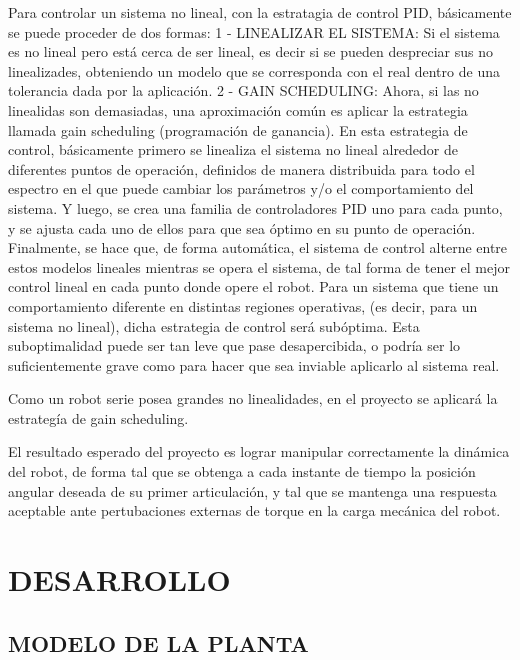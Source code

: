 \documentclass{article}
\begin{document}
Para controlar un sistema no lineal, con la estratagia de control PID, básicamente se puede proceder de dos formas:
1 - LINEALIZAR EL SISTEMA: Si el sistema es no lineal pero está cerca de ser lineal, es decir si se pueden despreciar sus no linealizades, obteniendo un modelo que se corresponda con el real dentro de una tolerancia dada por la aplicación.
2 - GAIN SCHEDULING: Ahora, si las no linealidas son demasiadas, una aproximación común es aplicar la estrategia llamada gain scheduling (programación de ganancia). En esta estrategia de control, básicamente primero se linealiza el sistema no lineal alrededor de diferentes puntos de operación, definidos de manera distribuida para todo el espectro en el que puede cambiar los parámetros y/o el comportamiento del sistema. Y luego, se crea una familia de controladores PID uno para cada punto, y se ajusta cada uno de ellos para que sea óptimo en su punto de operación. Finalmente, se hace que, de forma automática, el sistema de control alterne entre estos modelos lineales mientras se opera el sistema, de tal forma de tener el mejor control lineal en cada punto donde opere el robot.
Para un sistema que tiene un comportamiento diferente en distintas regiones operativas, (es decir, para un sistema no lineal), dicha estrategia de control será subóptima. Esta suboptimalidad puede ser tan leve que pase desapercibida, o podría ser lo suficientemente grave como para hacer que sea inviable aplicarlo al sistema real.

Como un robot serie posea grandes no linealidades, en el proyecto se aplicará la estrategía de gain scheduling.

El resultado esperado del proyecto es lograr manipular correctamente la dinámica del robot, de forma tal que se obtenga a cada instante de tiempo la posición angular deseada de su primer articulación, y tal que se mantenga una respuesta aceptable ante pertubaciones externas de torque en la carga mecánica del robot.



\section{DESARROLLO}
\label{sec:DESARROLLO}

\subsection{MODELO DE LA PLANTA}
\label{sec:MODELO DE LA PLANTA}
\end{document}
